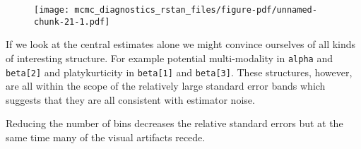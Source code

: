 \documentclass[
  letterpaper,
  DIV=11,
  numbers=noendperiod]{scrartcl}
\newenvironment{Shaded}{\begin{snugshade}}{\end{snugshade}}
\newcommand{\AttributeTok}[1]{\textcolor[rgb]{0.40,0.45,0.13}{#1}}
\newcommand{\DecValTok}[1]{\textcolor[rgb]{0.68,0.00,0.00}{#1}}
\newcommand{\FunctionTok}[1]{\textcolor[rgb]{0.28,0.35,0.67}{#1}}
\newcommand{\NormalTok}[1]{\textcolor[rgb]{0.00,0.23,0.31}{#1}}
\newcommand{\SpecialCharTok}[1]{\textcolor[rgb]{0.37,0.37,0.37}{#1}}
\newcommand{\StringTok}[1]{\textcolor[rgb]{0.13,0.47,0.30}{#1}}
\begin{document}
\begin{Shaded}
\end{Shaded}

\begin{figure}[H]

{\centering \texttt{[image: mcmc\_diagnostics\_rstan\_files/figure-pdf/unnamed-chunk-21-1.pdf]}

}

\end{figure}

If we look at the central estimates alone we might convince ourselves of
all kinds of interesting structure. For example potential multi-modality
in \texttt{alpha} and \texttt{beta{[}2{]}} and platykurticity in
\texttt{beta{[}1{]}} and \texttt{beta{[}3{]}}. These structures,
however, are all within the scope of the relatively large standard error
bands which suggests that they are all consistent with estimator noise.

Reducing the number of bins decreases the relative standard errors but
at the same time many of the visual artifacts recede.
\end{document}
